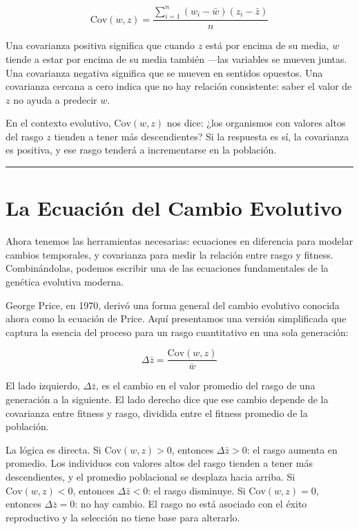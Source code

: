 \documentclass[
  letterpaper,
  DIV=11,
  numbers=noendperiod]{scrreprt}
\begin{document}
\[\text{Cov}(w, z) = \frac{\sum_{i=1}^{n}(w_i - \bar{w})(z_i - \bar{z})}{n}\]

Una covarianza positiva significa que cuando \(z\) está por encima de su
media, \(w\) tiende a estar por encima de su media también ---las
variables se mueven juntas. Una covarianza negativa significa que se
mueven en sentidos opuestos. Una covarianza cercana a cero indica que no
hay relación consistente: saber el valor de \(z\) no ayuda a predecir
\(w\).

En el contexto evolutivo, \(\text{Cov}(w, z)\) nos dice: ¿los organismos
con valores altos del rasgo \(z\) tienden a tener más descendientes? Si
la respuesta es sí, la covarianza es positiva, y ese rasgo tenderá a
incrementarse en la población.

\begin{center}\rule{0.5\linewidth}{0.5pt}\end{center}

\section{La Ecuación del Cambio
Evolutivo}\label{la-ecuaciuxf3n-del-cambio-evolutivo}

Ahora tenemos las herramientas necesarias: ecuaciones en diferencia para
modelar cambios temporales, y covarianza para medir la relación entre
rasgo y fitness. Combinándolas, podemos escribir una de las ecuaciones
fundamentales de la genética evolutiva moderna.

George Price, en 1970, derivó una forma general del cambio evolutivo
conocida ahora como la ecuación de Price. Aquí presentamos una versión
simplificada que captura la esencia del proceso para un rasgo
cuantitativo en una sola generación:

\[\Delta \bar{z} = \frac{\text{Cov}(w, z)}{\bar{w}}\]

El lado izquierdo, \(\Delta \bar{z}\), es el cambio en el valor promedio
del rasgo de una generación a la siguiente. El lado derecho dice que ese
cambio depende de la covarianza entre fitness y rasgo, dividida entre el
fitness promedio de la población.

La lógica es directa. Si \(\text{Cov}(w, z) > 0\), entonces
\(\Delta \bar{z} > 0\): el rasgo aumenta en promedio. Los individuos con
valores altos del rasgo tienden a tener más descendientes, y el promedio
poblacional se desplaza hacia arriba. Si \(\text{Cov}(w, z) < 0\),
entonces \(\Delta \bar{z} < 0\): el rasgo disminuye. Si
\(\text{Cov}(w, z) = 0\), entonces \(\Delta \bar{z} = 0\): no hay
cambio. El rasgo no está asociado con el éxito reproductivo y la
selección no tiene base para alterarlo.
\end{document}
